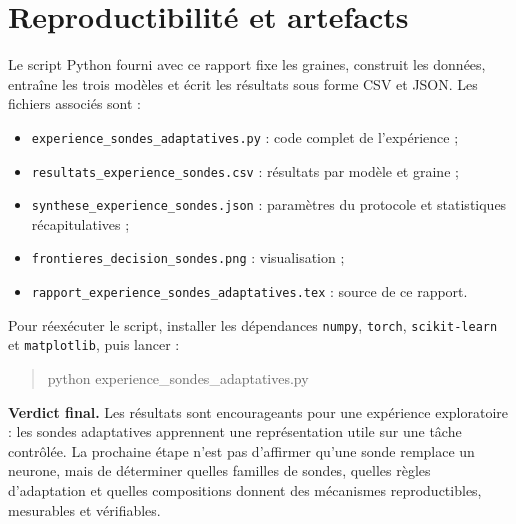 \documentclass[11pt,a4paper]{article}
\begin{document}
\section{Reproductibilité et artefacts}
Le script Python fourni avec ce rapport fixe les graines, construit les données, entraîne les trois modèles et écrit les résultats sous forme CSV et JSON. Les fichiers associés sont :
\begin{itemize}[leftmargin=1.5em]
  \item \texttt{experience\_sondes\_adaptatives.py} : code complet de l'expérience ;
  \item \texttt{resultats\_experience\_sondes.csv} : résultats par modèle et graine ;
  \item \texttt{synthese\_experience\_sondes.json} : paramètres du protocole et statistiques récapitulatives ;
  \item \texttt{frontieres\_decision\_sondes.png} : visualisation ;
  \item \texttt{rapport\_experience\_sondes\_adaptatives.tex} : source de ce rapport.
\end{itemize}
Pour réexécuter le script, installer les dépendances \texttt{numpy}, \texttt{torch}, \texttt{scikit-learn} et \texttt{matplotlib}, puis lancer :
\begin{quote}\ttfamily python experience\_sondes\_adaptatives.py\end{quote}

\bigskip
\noindent\textbf{Verdict final.} Les résultats sont encourageants pour une expérience exploratoire : les sondes adaptatives apprennent une représentation utile sur une tâche contrôlée. La prochaine étape n'est pas d'affirmer qu'une sonde remplace un neurone, mais de déterminer quelles familles de sondes, quelles règles d'adaptation et quelles compositions donnent des mécanismes reproductibles, mesurables et vérifiables.
\end{document}
